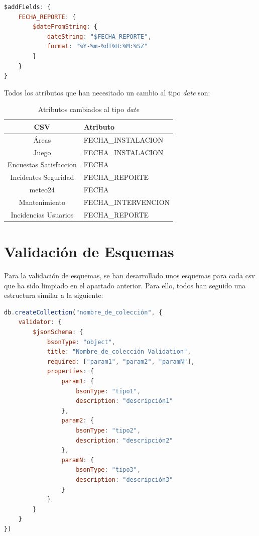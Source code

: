 \documentclass[]{article}
\begin{document}
\begin{lstlisting}[language=JavaScript, caption=Cambio a date de las fechas]
$addFields: {
    FECHA_REPORTE: {
        $dateFromString: {
            dateString: "$FECHA_REPORTE",
            format: "%Y-%m-%dT%H:%M:%SZ"
        }
    }
}
\end{lstlisting}

Todos los atributos que han necesitado un cambio al tipo \textit{date} son:

\begin{table}[H]
    \centering
    \begin{tabular}{| c | l | }
        \hline
        CSV & Atributo \\ \hline
        Áreas & FECHA\_INSTALACION \\
        Juego & FECHA\_INSTALACION \\ 
        Encuestas Satisfaccion & FECHA\\ 
        Incidentes Seguridad & FECHA\_REPORTE \\ 
        meteo24 & FECHA\\ 
        Mantenimiento & FECHA\_INTERVENCION\\ 
        Incidencias Usuarios & FECHA\_REPORTE\\ 
        \hline
    \end{tabular}
    \caption{Atributos cambiados al tipo \textit{date}}
\end{table}

\newpage
\section{Validación de Esquemas}
\label{sec:validacion}
Para la validación de esquemas, se han desarrollado unos esquemas para cada csv que ha sido limpiado en el apartado anterior. Para ello, todos han seguido una estructura similar a la siguiente:

\begin{lstlisting}[language=JavaScript, caption=Estructura genérica de la validación de esquemas]
db.createCollection("nombre_de_colección", {
    validator: {
        $jsonSchema: {
            bsonType: "object",
            title: "Nombre_de_colección Validation",
            required: ["param1", "param2", "paramN"],
            properties: {
                param1: {
                    bsonType: "tipo1",
                    description: "descripción1"
                },
                param2: {
                    bsonType: "tipo2",
                    description: "descripción2"
                },
                paramN: {
                    bsonType: "tipo3",
                    description: "descripción3"
                }
            }
        }
    }
})
\end{lstlisting}
\end{document}
